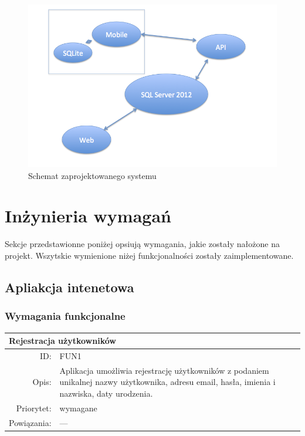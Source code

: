 \begin{figure}[ht]
	\centering
		\includegraphics[width=1\linewidth]{assets/system_schema.png}
	\caption{Schemat zaprojektowanego systemu}
	\label{fig:system_schema}
\end{figure}


\section{Inżynieria wymagań} %
\label{sec:in_ynieria_wymaga_}
Sekcje przedstawionne poniżej opsiują wymagania, jakie zostały nałożone na projekt. Wszytskie wymienione niżej funkcjonalności zostały zaimplementowane.

\subsection{Apliakcja intenetowa} %
\label{sub:apliakcja_intenetowa}
\subsubsection{Wymagania funkcjonalne}
\begin{center}
      \begin{tabular}{rp{10cm}}
	      \multicolumn{2}{l}{\textbf{Rejestracja użytkowników}} \\
	      \hline
	      ID: & FUN1 \\
	      Opis: & Aplikacja umożliwia rejestrację użytkowników z podaniem unikalnej nazwy użytkownika, adresu email, hasła, imienia i nazwiska, daty urodzenia. \\
	      Priorytet: & wymagane \\
	      Powiązania: & --- \\
    \end{tabular}
\end{center}


